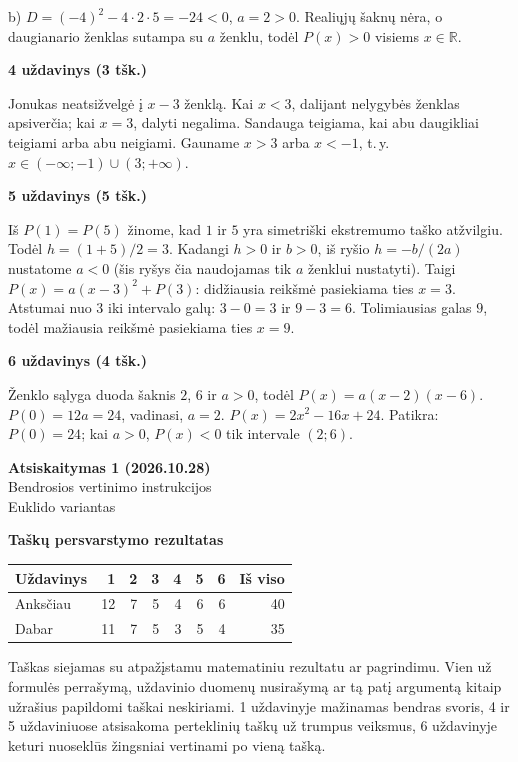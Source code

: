 \documentclass[11pt]{article}
\newcommand{\antraste}[1]{\begin{center}\Large\textbf{Atsiskaitymas 1 (2026.10.28)}\\\large #1\\\normalsize Euklido variantas\end{center}}
\newcommand{\sk}[1]{\par\medskip\textbf{#1}\par}
\begin{document}
b) $D=(-4)^2-4\cdot2\cdot5=-24<0$, $a=2>0$.
Realiųjų šaknų nėra, o daugianario ženklas sutampa su $a$ ženklu, todėl $P(x)>0$ visiems $x\in\mathbb R$.
\sk{4 uždavinys (3 tšk.)}
Jonukas neatsižvelgė į $x-3$ ženklą. Kai $x<3$, dalijant nelygybės ženklas apsiverčia; kai $x=3$, dalyti negalima.
Sandauga teigiama, kai abu daugikliai teigiami arba abu neigiami.
Gauname $x>3$ arba $x<-1$, t.\,y. $\boxed{x\in(-\infty;-1)\cup(3;+\infty)}$.
\sk{5 uždavinys (5 tšk.)}
Iš $P(1)=P(5)$ žinome, kad $1$ ir $5$ yra simetriški ekstremumo taško atžvilgiu. Todėl $h=(1+5)/2=3$. Kadangi $h>0$ ir $b>0$, iš ryšio $h=-b/(2a)$ nustatome $a<0$ (šis ryšys čia naudojamas tik $a$ ženklui nustatyti).
Taigi $P(x)=a(x-3)^2+P(3)$: didžiausia reikšmė pasiekiama ties $x=3$.
Atstumai nuo $3$ iki intervalo galų: $3-0=3$ ir $9-3=6$.
Tolimiausias galas $9$, todėl mažiausia reikšmė pasiekiama ties $x=9$.
\sk{6 uždavinys (4 tšk.)}
Ženklo sąlyga duoda šaknis $2$, $6$ ir $a>0$, todėl $P(x)=a(x-2)(x-6)$.
$P(0)=12a=24$, vadinasi, $a=2$.
$\boxed{P(x)=2x^2-16x+24}$.
Patikra: $P(0)=24$; kai $a>0$, $P(x)<0$ tik intervale $(2;6)$.
\newpage
\antraste{Bendrosios vertinimo instrukcijos}\small
\sk{Taškų persvarstymo rezultatas}
\begin{center}\begin{tabular}{lrrrrrrr}\toprule Uždavinys&1&2&3&4&5&6&Iš viso\\\midrule
Anksčiau&12&7&5&4&6&6&40\\
Dabar&11&7&5&3&5&4&35\\\bottomrule\end{tabular}\end{center}
Taškas siejamas su atpažįstamu matematiniu rezultatu ar pagrindimu. Vien už formulės perrašymą, uždavinio duomenų nusirašymą ar tą patį argumentą kitaip užrašius papildomi taškai neskiriami.
1 uždavinyje mažinamas bendras svoris, 4 ir 5 uždaviniuose atsisakoma perteklinių taškų už trumpus veiksmus, 6 uždavinyje keturi nuoseklūs žingsniai vertinami po vieną tašką.
\end{document}
